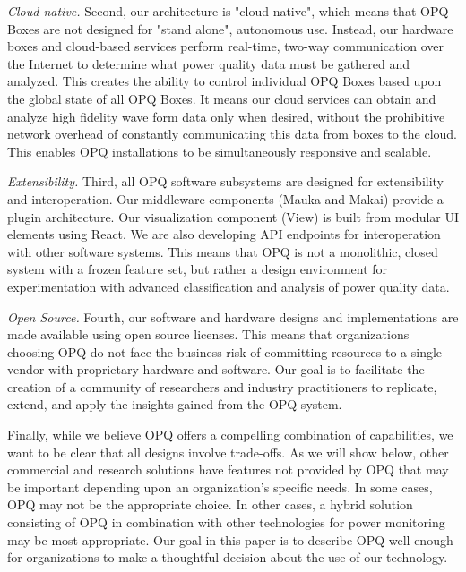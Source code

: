 {\em Cloud native.} Second, our architecture is "cloud native", which means that OPQ Boxes are not designed for "stand alone", autonomous use. Instead, our hardware boxes and cloud-based services perform real-time, two-way communication over the Internet to determine what power quality data must be gathered and analyzed. This creates the ability to control individual OPQ Boxes based upon the global state of all OPQ Boxes. It means our cloud services can obtain and analyze high fidelity wave form data only when desired, without the prohibitive network overhead of constantly communicating this data from boxes to the cloud. This enables OPQ installations to be simultaneously responsive and scalable.

{\em Extensibility.} Third, all OPQ software subsystems are designed for extensibility and interoperation. Our middleware components (Mauka and Makai) provide a plugin architecture. Our visualization component (View) is built from modular UI elements using React. We are also developing API endpoints for interoperation with other software systems. This means that OPQ is not a monolithic, closed system with a frozen feature set, but rather a design environment for experimentation with advanced classification and analysis of power quality data.

{\em Open Source.} Fourth, our software and hardware designs and implementations are made available using open source licenses. This means that organizations choosing OPQ do not face the business risk of committing resources to a single vendor with proprietary hardware and software. Our goal is to facilitate the creation of a community of researchers and industry practitioners to replicate, extend, and apply the insights gained from the OPQ system.

Finally, while we believe OPQ offers a compelling combination of capabilities, we want to be clear that all designs involve trade-offs. As we will show below, other commercial and research solutions have features not provided by OPQ that may be important depending upon an organization's specific needs. In some cases, OPQ may not be the appropriate choice. In other cases, a hybrid solution consisting of OPQ in combination with other technologies for power monitoring may be most appropriate. Our goal in this paper is to describe OPQ well enough for organizations to make a thoughtful decision about the use of our technology.


